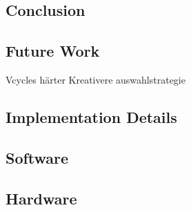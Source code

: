 \documentclass[a4paper,12pt,bibtotoc,titlepage, liststotoc,BCOR7mm,headsepline,pointlessnumbers]{scrbook}
\numberwithin{equation}{section}
\begin{document}
\section{Conclusion}
\section{Future Work}
Vcycles härter
Kreativere auswahlstrategie

\clearpage
\begin{appendix}
\chapter{Implementation Details}
\section{Software}
\section{Hardware}
\end{appendix}


\end{document}
